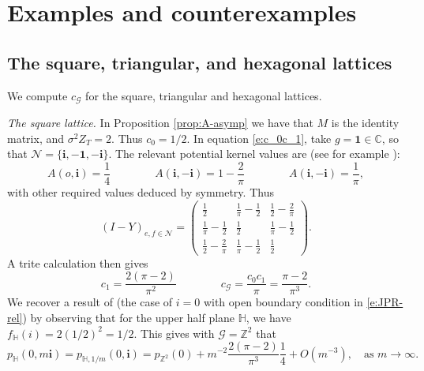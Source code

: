 \documentclass[11pt]{article}
\theoremstyle{remark}
\def\cG{\mathcal{G}}
\begin{document}
\section{Examples and counterexamples}
\label{sec:ex-and-counter-ex}

\subsection{The square, triangular, and hexagonal lattices}

We compute $c_\cG$ for the square, triangular and hexagonal lattices.

\emph{The square lattice.} 
In Proposition \ref{prop:A-asymp} we have that $M$ is the identity matrix, and 
$\sigma^2 Z_T = 2$. Thus $c_0 = 1/2$. In equation \ref{e:c_0c_1}, take 
$g = \mathbf{1} \in \mathbb{C}$, so that 
$\mathcal{N} = \{ \mathbf{i}, \mathbf{-1}, \mathbf{-i} \}$. The relevant potential kernel 
values are (see for example \cite{Sp-book}): 
\[ A(o,\mathbf{i})
   = \frac{1}{4} \qquad\qquad 
   A(\mathbf{i},\mathbf{-i})
   = 1 - \frac{2}{\pi} \qquad\qquad
   A(\mathbf{i},\mathbf{-i})
   = \frac{1}{\pi}, \]
with other required values deduced by symmetry. Thus
\[ (I - Y)_{e,f \in \mathcal{N}}
   = \begin{pmatrix}
   \frac{1}{2} & \frac{1}{\pi} - \frac{1}{2} & \frac{1}{2} - \frac{2}{\pi} \\[0.2cm]
   \frac{1}{\pi} - \frac{1}{2} & \frac{1}{2} & \frac{1}{\pi} - \frac{1}{2} \\[0.2cm]
   \frac{1}{2} - \frac{2}{\pi} & \frac{1}{\pi} - \frac{1}{2} & \frac{1}{2}
   \end{pmatrix}. \]
A trite calculation then gives
\[ c_1 = \frac{2(\pi - 2)}{\pi^2} \qquad\qquad
   c_\cG = \frac{c_0 c_1}{\pi} = \frac{\pi - 2}{\pi^3}. \]
We recover a result of \cite{BIP-93} (the case of $i = 0$ with open boundary condition in \eqref{e:JPR-rel}) by observing that for the upper half plane $\mathbb{H}$, we have
$f_{\mathbb{H}}(i) = 2 (1/2)^2 = 1/2$. This gives with $\cG = \mathbb{Z}^2$ that
\[ p_{\mathbb{H}}(0,m \mathbf{i})
   = p_{\mathbb{H},1/m}(0,\mathbf{i})
   = p_{\mathbb{Z}^2}(0) + m^{-2} \frac{2 (\pi - 2)}{\pi^3} \frac{1}{4} + O(m^{-3}), \quad \text{as $m \to \infty$.} \]
\end{document}
